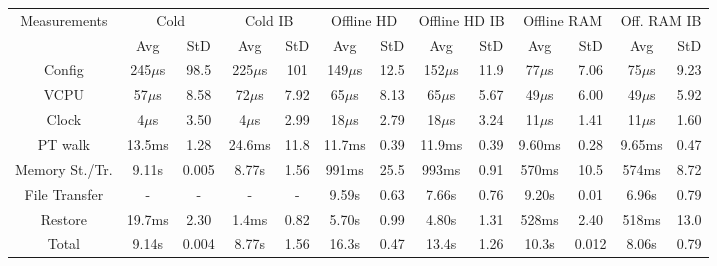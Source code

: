 \documentclass[border=0pt]{standalone}
\begin{document}
	
	\begin{tabular}{|c|c|c|c|c|c|c|c|c|c|c|c|c|}
		\hline
		\multirow{2}{*}{Measurements} & \multicolumn{2}{c|}{Cold} & \multicolumn{2}{c|}{Cold IB} & \multicolumn{2}{c|}{Offline HD} & \multicolumn{2}{c|}{Offline HD IB} & \multicolumn{2}{c|}{Offline RAM} & \multicolumn{2}{c|}{Off. RAM IB} \\
		\cline{2-13}
		& Avg & StD & Avg & StD & Avg & StD & Avg & StD & Avg & StD & Avg & StD\\
		\hline
		Config & 245$\mu$s & 98.5 & 225$\mu$s & 101 & 149$\mu$s & 12.5 & 152$\mu$s & 11.9 & 77$\mu$s & 7.06 & 75$\mu$s & 9.23  \\
		\hline
		VCPU & 57$\mu$s & 8.58 & 72$\mu$s & 7.92 & 65$\mu$s  & 8.13 & 65$\mu$s  & 5.67 & 49$\mu$s & 6.00 & 49$\mu$s & 5.92   \\
		\hline
		Clock & 4$\mu$s & 3.50 & 4$\mu$s & 2.99 & 18$\mu$s  & 2.79 & 18$\mu$s  & 3.24 & 11$\mu$s & 1.41 & 11$\mu$s & 1.60  \\
		\hline
		PT walk & 13.5ms & 1.28 & 24.6ms & 11.8 & 11.7ms & 0.39 & 11.9ms & 0.39 & 9.60ms & 0.28 & 9.65ms & 0.47  \\
		\hline
		Memory St./Tr. & 9.11s & 0.005 & 8.77s & 1.56 & 991ms & 25.5 & 993ms & 0.91 & 570ms & 10.5 & 574ms & 8.72 \\
		\hline
		File Transfer & - & - & - & - & 9.59s & 0.63 & 7.66s & 0.76 & 9.20s & 0.01 & 6.96s & 0.79  \\
		\hline
		Restore & 19.7ms & 2.30 & 1.4ms & 0.82 & 5.70s & 0.99 & 4.80s & 1.31 & 528ms & 2.40 & 518ms & 13.0  \\
		\hline
		Total & 9.14s & 0.004 & 8.77s & 1.56 & 16.3s & 0.47 & 13.4s & 1.26 & 10.3s & 0.012 & 8.06s & 0.79  \\
		\hline
		
	\end{tabular}
\end{document}
